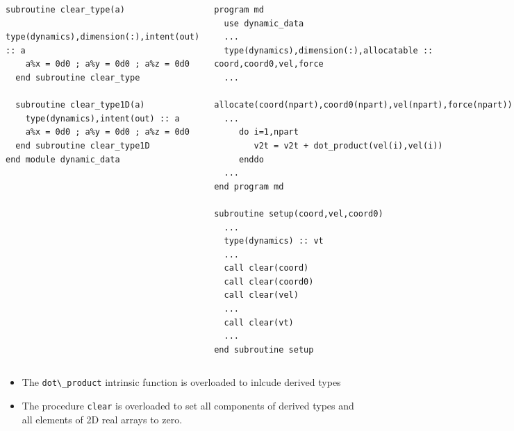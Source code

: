 \documentclass[c,mathserif,compress,xcolor=svgnames]{beamer}
\newcommand{\lstfortran}[1]{\lstinline[language={[90]Fortran},basicstyle=\footnotesize\ttfamily]|#1|}
\newenvironment{eblock}[0]
{
\begin{beamerboxesrounded}[upper=uppercol2,lower=lowercol2,shadow=true]}
{\end{beamerboxesrounded}}
\begin{document}
\begin{frame}
{\begin{columns}[t]
\begin{eblock}{}
\begin{lstlisting}[language={[90]Fortran},basicstyle=\fontsize{5}{6}\selectfont\ttfamily]
  subroutine clear_type(a)
    type(dynamics),dimension(:),intent(out) :: a
    a%x = 0d0 ; a%y = 0d0 ; a%z = 0d0
  end subroutine clear_type

  subroutine clear_type1D(a)
    type(dynamics),intent(out) :: a
    a%x = 0d0 ; a%y = 0d0 ; a%z = 0d0
  end subroutine clear_type1D
end module dynamic_data
        \end{lstlisting}
      \end{eblock}
      \column{6cm}
      \vspace{-0.5cm}
      \begin{eblock}{}
        \begin{lstlisting}[language={[90]Fortran},basicstyle=\fontsize{5}{6}\selectfont\ttfamily]
program md
  use dynamic_data
  ...
  type(dynamics),dimension(:),allocatable :: coord,coord0,vel,force
  ...
  allocate(coord(npart),coord0(npart),vel(npart),force(npart))
  ...
     do i=1,npart
        v2t = v2t + dot_product(vel(i),vel(i))
     enddo
  ...
end program md

subroutine setup(coord,vel,coord0)
  ...
  type(dynamics) :: vt
  ...
  call clear(coord)
  call clear(coord0)
  call clear(vel)
  ...
  call clear(vt)
  ...
end subroutine setup
        \end{lstlisting}
      \end{eblock}
    \end{columns}
  }
  \begin{itemize}
    \item The \lstfortran{dot\_product} intrinsic function is overloaded to inlcude derived types
    \item The procedure \lstfortran{clear} is overloaded to set all components of derived types and all elements of 2D real arrays to zero. 
  \end{itemize}
\end{frame}
\end{document}
